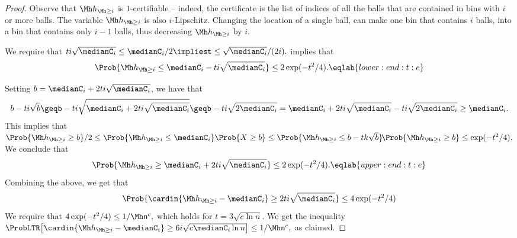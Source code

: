\begin{proof}
    Observe that $\NHX{i}$ is $1$-certifiable -- indeed, the
    certificate is the list of indices of all the balls that are
    contained in bins with $i$ or more balls. The variable $\NHX{i}$
    is also $i$-Lipschitz. Changing the location of a single ball, can
    make one bin that contains $i$ balls, into a bin that contains
    only $i-1$ balls, thus decreasing $\NHX{i}$ by $i$.

    We require that
    \begin{math}
        ti\sqrt{ \medianC_i} \leq \medianC_i/2%
        \implies%
        t \leq \sqrt{ \medianC_i}/(2i).%
    \end{math}    
     implies that
    \begin{equation}
        \Prob{ \NHX{i} \leq  \medianC_i - ti\sqrt{ \medianC_i}}%
        \leq 2\exp(-t^2/4).
        \eqlab{lower:end:t:e}
    \end{equation}

    Setting $b = \medianC_i + 2 ti\sqrt{\medianC_i}$, we have that
    \begin{equation*}
        b- ti\sqrt{b}%
        \geq%
        b - ti \sqrt{\medianC_i + 2 ti\sqrt{\medianC_i}} 
        \geq%
        b - ti \sqrt{2 \medianC_i} %
        =%
        \medianC_i + 2 ti\sqrt{\medianC_i} - ti \sqrt{2 \medianC_i}%
        \geq%
        \medianC_i.        
    \end{equation*}
    This implies that
    \begin{math}
        \Prob{ \NHX{i} \geq b} /2%
        \leq %
        \Prob{ \NHX{i} \leq \medianC_i} \Prob{X \geq b}%
        \leq %
        \Prob{ \NHX{i} \leq b- tk\sqrt{b}}%
        \!\Prob{\NHX{i} \geq b} \leq \exp(-t^2/4).
    \end{math}
    We conclude that
    \begin{equation}
        \Prob{ \NHX{i} \geq \medianC_i + 2 ti\sqrt{\medianC_i}}%
        \leq 2 \exp(-t^2/4).
        \eqlab{upper:end:t:e}
    \end{equation}
    Combining the above, we get that
    \begin{equation*}
        \Prob{ \cardin{\NHX{i} - \medianC_i} \geq
           2ti\sqrt{\medianC_i}}%
        \leq 4 \exp(-t^2/4)
    \end{equation*}
    We require that 
    \begin{math}
        4 \exp(-t^2/4) \leq {1}/{\nballs^{c}},
    \end{math}
    which holds for $ t= 3\sqrt{c \ln n}$.
    We get the inequality
    \begin{math}
        \ProbLTR \bigl[ \cardin{\NHX{i} - \medianC_i} \geq 6 i\sqrt{c
           \medianC_i \ln n} \bigr]%
        \leq {1}/{\nballs^{c}},
    \end{math}
    as claimed.
    

\end{proof}

